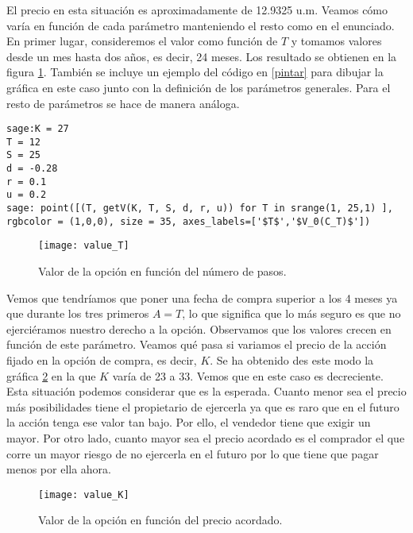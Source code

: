 El precio en esta situación es aproximadamente de 12.9325 u.m. Veamos cómo varía en función de cada parámetro manteniendo el resto como en el enunciado. En primer lugar, consideremos el valor como función de $ T $ y tomamos valores desde un mes hasta dos años, es decir, 24 meses. Los resultado se obtienen en la figura \ref{valueT}. También se incluye un ejemplo del código en \ref{pintar} para dibujar la gráfica en este caso junto con la definición de los parámetros generales. Para el resto de parámetros se hace de manera análoga. 

\begin{lstlisting}[label={pintar}, caption={Código en Sage para dibujar una gráfica}, morekeywords={sage}]
sage:K = 27
T = 12
S = 25
d = -0.28
r = 0.1
u = 0.2
sage: point([(T, getV(K, T, S, d, r, u)) for T in srange(1, 25,1) ], rgbcolor = (1,0,0), size = 35, axes_labels=['$T$','$V_0(C_T)$'])          	 
\end{lstlisting}

\begin{figure}[h!]
	\centering
	\texttt{[image: value\_T]}
	\caption{Valor de la opción en función del número de pasos.}
	\label{valueT}
\end{figure}

Vemos que tendríamos que poner una fecha de compra superior a los 4 meses ya que durante los tres primeros $ A = T $, lo que significa que lo más seguro es que no ejerciéramos nuestro derecho a la opción. Observamos que los valores crecen en función de este parámetro. Veamos qué pasa si variamos el precio de la acción fijado en la opción de compra, es decir, $ K $. Se ha obtenido des este modo la gráfica \ref{valueK} en la que $ K $ varía de 23 a 33. Vemos que en este caso es decreciente. Esta situación podemos considerar que es la esperada. Cuanto menor sea el precio más posibilidades tiene el propietario de ejercerla ya que es raro que en el futuro la acción tenga ese valor tan bajo. Por ello, el vendedor tiene que exigir un mayor. Por otro lado, cuanto mayor sea el precio acordado es el comprador el que corre un mayor riesgo de no ejercerla en el futuro por lo que tiene que pagar menos por ella ahora. \\

\begin{figure}[h!]
	\centering
	\texttt{[image: value\_K]}
	\caption{Valor de la opción en función del precio acordado.}
	\label{valueK}
\end{figure} 


